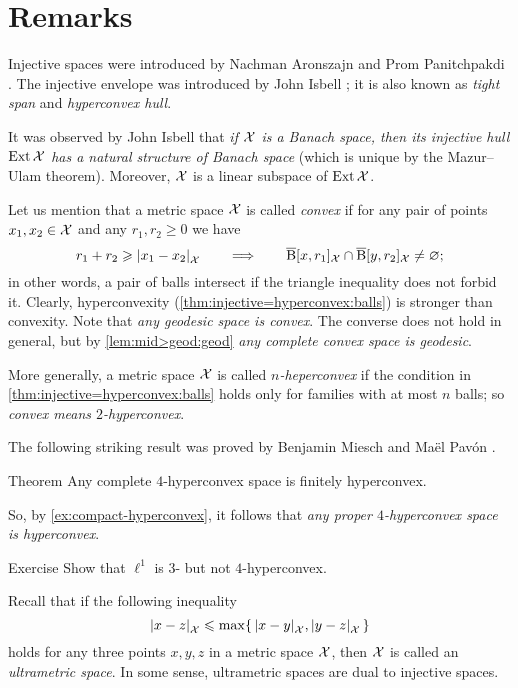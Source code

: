 \section{Remarks}

Injective spaces were introduced by Nachman Aronszajn and Prom Panitchpakdi \cite{aronszajn-panitchpakdi}.
The injective envelope was introduced by John Isbell \cite{isbell}; it is also known as \emph{tight span} and \emph{hyperconvex hull}.

It was observed by John Isbell \cite{isbell2} that \textit{if $\mathcal{X}$ is a Banach space, then its injective hull $\mathop{\rm Ext}\nolimits\mathcal{X}$ has a natural structure of Banach space} (which is unique by the Mazur--Ulam theorem).
Moreover, $\mathcal{X}$ is a linear subspace of $\mathop{\rm Ext}\nolimits\mathcal{X}$.
 
Let us mention that a metric space $\mathcal{X}$ is called \emph{convex} if for any pair of points $x_1,x_2\in \mathcal{X}$ and any $r_1,r_2\ge 0$ we have 
\[r_1+r_2\ge \dist{x_1}{x_2}{\spc{X}}\qquad\Longrightarrow\qquad\cBall[x,r_1]_\spc{X}\cap \cBall[y,r_2]_\spc{X}\ne\emptyset;\]
in other words, a pair of balls intersect if the triangle inequality does not forbid it.
Clearly, hyperconvexity (\ref{thm:injective=hyperconvex:balls}) is stronger than convexity.
Note that \textit{any geodesic space is convex}.
The converse does not hold in general, but by \ref{lem:mid>geod:geod} \textit{any complete convex space is geodesic}.

More generally, a metric space $\mathcal{X}$ is called \emph{$n$-heperconvex} if the condition in \ref{thm:injective=hyperconvex:balls} holds only for families with at most $n$ balls; so \textit{convex means $2$-hyperconvex}.

The following striking result was proved by Benjamin Miesch and Maël Pavón \cite{miesch-pavon2016}.

\begin{thm}{Theorem}
Any complete $4$-hyperconvex space is finitely hyperconvex.
\end{thm}

So, by \ref{ex:compact-hyperconvex}, it follows that \textit{any proper $4$-hyperconvex space is hyperconvex}.

\begin{thm}{Exercise}\label{ex:3-4-hypreconvex}
Show that $\ell^1$ is $3$- but not $4$-hyperconvex.
\end{thm}
 

Recall that if the following inequality
\[\dist{x}{z}{\spc{X}}
\le
\max\{\,\dist{x}{y}{\spc{X}},\dist{y}{z}{\spc{X}}\,\}\]
holds for any three points $x,y,z$ in a metric space $\mathcal{X}$,
then $\mathcal{X}$ is called an \emph{ultrametric space}.
In some sense, ultrametric spaces are dual to injective spaces.


